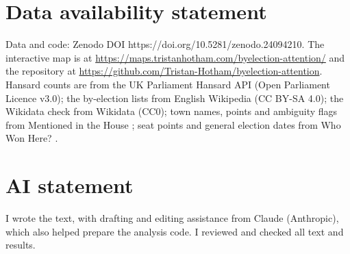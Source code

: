 \documentclass[11pt,a4paper]{article}
\begin{document}
\section*{Data availability statement}
Data and code: Zenodo DOI https://doi.org/10.5281/zenodo.24094210. The interactive map is at \url{https://maps.tristanhotham.com/byelection-attention/} and the repository at \url{https://github.com/Tristan-Hotham/byelection-attention}. Hansard counts are from the UK Parliament Hansard API (Open Parliament Licence v3.0); the by-election lists from English Wikipedia (CC BY-SA 4.0); the Wikidata check from Wikidata (CC0); town names, points and ambiguity flags from Mentioned in the House \citep{hotham2026a}; seat points and general election dates from Who Won Here? \citep{hotham2026b}.

\section*{AI statement}
I wrote the text, with drafting and editing assistance from Claude (Anthropic), which also helped prepare the analysis code. I reviewed and checked all text and results.
\end{document}
